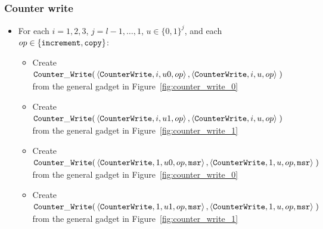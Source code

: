 \subsubsection{ Counter write }

\begin{itemize}

    \item For each $i = 1,2,3$,
                   $j = l-1,\ldots,1$,
                   $u \in \{0, 1\}^j$, and each
                   $op \in \{{\tt increment}, {\tt copy} \}$:
        \begin{itemize}
        \item Create
        $\begin{aligned}[t]
            {\tt Counter\_Write}(& \left\langle {\tt CounterWrite}, i, u0, op \right\rangle,
                      \left\langle {\tt CounterWrite}, i, u,  op \right\rangle \;)
        \end{aligned}$ \\ from the general gadget in Figure~\ref{fig:counter_write_0}

        \item Create
        $\begin{aligned}[t]
            {\tt Counter\_Write}(& \left\langle {\tt CounterWrite}, i,  u1, op \right\rangle,
                      \left\langle {\tt CounterWrite}, i,  u,  op \right\rangle \;)
        \end{aligned}$ \\ from the general gadget in Figure~\ref{fig:counter_write_1}


        \item Create
        $\begin{aligned}[t]
            {\tt Counter\_Write}(& \left\langle {\tt CounterWrite}, 1, u0, op, {\tt msr} \right\rangle,
                      \left\langle {\tt CounterWrite}, 1, u,  op, {\tt msr} \right\rangle \;)
        \end{aligned}$ \\ from the general gadget in Figure~\ref{fig:counter_write_0}

        \item Create
        $\begin{aligned}[t]
            {\tt Counter\_Write}(& \left\langle {\tt CounterWrite}, 1,  u1, op, {\tt msr} \right\rangle,
                      \left\langle {\tt CounterWrite}, 1,  u,  op, {\tt msr} \right\rangle \;)
        \end{aligned}$ \\ from the general gadget in Figure~\ref{fig:counter_write_1}


\end{itemize}
\end{itemize}
